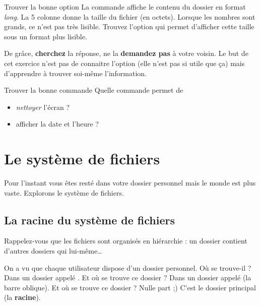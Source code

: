 \documentclass[a4paper,11pt]{style-esi/td}
\begin{document}
		\begin{Exercice}{Trouver la bonne option} 
			La commande  
			affiche le contenu du dossier en format \textit{long}.
			La 5\ieme{} colonne donne la taille du fichier (en octets).
			Lorsque les nombres sont grands, ce n'est pas très lisible. 
			Trouvez l'option qui permet d'afficher cette taille sous un format plus lisible.  
			
			\begin{alertbox} 
				De grâce, \textbf{cherchez} la réponse, 
				ne la \textbf{demandez pas} à votre voisin. 
				Le but de cet exercice n'est pas de connaitre l'option 
				(elle n'est pas si utile que \c ca) 
				mais d'apprendre à trouver soi-même l'information.  
			\end{alertbox}
		\end{Exercice}

		\begin{Exercice}{Trouver la bonne commande}
			Quelle commande permet de 
			\begin{itemize}
				\item \textit{nettoyer} l'écran ?  
				\item afficher la date et l'heure ?
			\end{itemize}
		\end{Exercice}

\section{Le système de fichiers}

	Pour l'instant vous êtes resté dans votre dossier personnel 
	mais le monde est plus vaste.
	Explorons le système de fichiers.

	\subsection{La racine du système de fichiers}

		Rappelez-vous que les fichiers sont organisés en hiérarchie :
		un dossier contient d'autres dossiers qui lui-même\dots

		On a vu que chaque utilisateur dispose d'un dossier personnel. 
		Où se trouve-il ? Dans un dossier appelé . 
		Et où se trouve ce dossier  ? 
		Dans un dossier appelé \og{}\samp{/}\fg{} (la barre oblique). 
		Et où se trouve ce dossier \og{}\samp{/}\fg{} ? Nulle part ;) 
		C'est le dossier principal (la \textbf{racine}).
\end{document}
